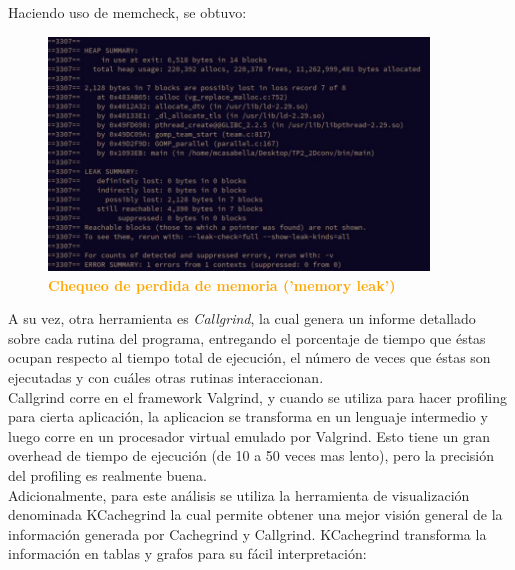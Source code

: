 \documentclass{article}
\begin{document}
Haciendo uso de memcheck, se obtuvo:
 \begin{figure}[H]
    \centering
      \includegraphics[width=0.90\textwidth]{figures/MEMORYLEAK.jpg}
       \centering
       \caption{\textbf{\textcolor{Orange}{Chequeo de perdida de memoria ('memory leak')}}}
    \end{figure}
\clearpage

A su vez, otra herramienta es \textit{Callgrind}, la cual genera un informe detallado sobre cada rutina del programa, entregando el porcentaje de tiempo que éstas ocupan
respecto al tiempo total de ejecución, el número de veces que éstas son ejecutadas y con cuáles otras rutinas interaccionan.\\

Callgrind corre en el framework Valgrind, y cuando se utiliza para hacer profiling para cierta aplicación, la aplicacion se transforma en un lenguaje intermedio y luego corre en un procesador virtual emulado por Valgrind. Esto tiene un gran overhead de tiempo de ejecución (de 10 a 50 veces mas lento), pero la precisión del profiling es realmente buena. \\

Adicionalmente, para este análisis se utiliza la herramienta de visualización denominada KCachegrind  la cual permite obtener una mejor visión general de la información generada por Cachegrind y Callgrind.  KCachegrind transforma la información en tablas y grafos para su fácil interpretación:
\end{document}
